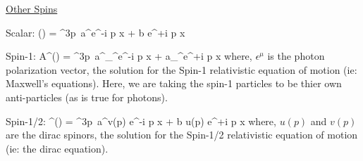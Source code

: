 {\lineacross

\underline{Other Spins}

Scalar:
\be
\Phi () = \int {}^3p\ a^\dagger e^{-i p x} + b e^{+i p x}
\ee


Spin-1:
\be
A^\mu () = \int {}^3p\ a^\dagger_\gamma \epsilon^\mu e^{-i p x} + a_\gamma \epsilon^\mu e^{+i p x}
\ee
where, $\epsilon^\mu$ is the photon polarization vector, the solution for the Spin-1 relativistic equation of motion (ie: Maxwell's equations).
Here, we are taking the spin-1 particles to be thier own anti-particles (as is true for photons).


Spin-1/2:
\be
\Psi^\mu () = \int {}^3p\ a^\dagger v(p) e^{-i p x} + b u(p) e^{+i p x}
\ee
where, $u(p)$ and $v(p)$ are the dirac spinors, the solution for the Spin-1/2 relativistic equation of motion (ie: the dirac equation).


%
%
%
%
%
%
%
%
%
%
%
%
%
%
%
%
%
}



